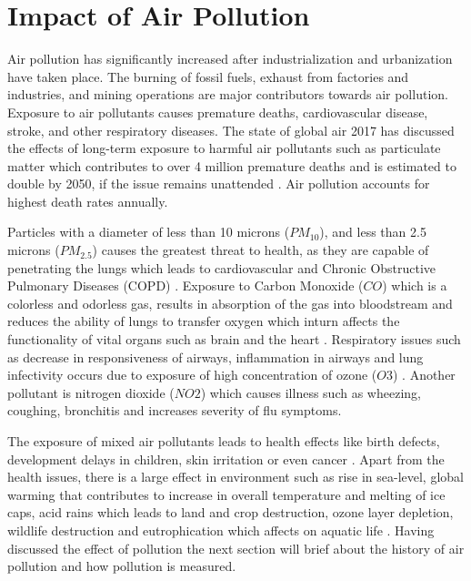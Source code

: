 \section{Impact of Air Pollution}

Air pollution has significantly increased after industrialization and urbanization have taken place. The burning of fossil fuels, exhaust from factories and industries, and mining operations are major contributors towards air pollution. Exposure to air pollutants causes premature deaths, cardiovascular disease, stroke, and other respiratory diseases. The state of global air 2017 has discussed the effects of long-term exposure to harmful air pollutants such as particulate matter which contributes to over 4 million premature deaths and is estimated to double by 2050, if the issue remains unattended \cite{HealthEffectsInstitute2017}. Air pollution accounts for highest death rates annually. 

\par

Particles with a diameter of less than 10 microns ($PM_{10}$), and less than 2.5 microns ($PM_{2.5}$) causes the greatest threat to health, as they are capable of penetrating the lungs which leads to cardiovascular and Chronic Obstructive Pulmonary Diseases (COPD) \cite{who} \cite{Tian2016}. Exposure to Carbon Monoxide ($CO$) which is a colorless and odorless gas, results in absorption of the gas into bloodstream and reduces the ability of lungs to transfer oxygen which inturn affects the functionality of vital organs such as brain and the heart \cite{Sierra-vargas2012} \cite{Golbabaei2012}. Respiratory issues such as decrease in responsiveness of airways, inflammation in airways and lung infectivity occurs due to exposure of high concentration of ozone ($O3$) \cite{Lippmann1989}. Another pollutant is nitrogen dioxide ($NO2$) which causes illness such as wheezing, coughing, bronchitis and increases severity of flu symptoms.
\par

 The exposure of mixed air pollutants leads to health effects like birth defects, development delays in children, skin irritation or even cancer \cite{MarilenaKampa2007}. Apart from the health issues, there is a large effect in environment such as rise in sea-level, global warming that contributes to increase in overall temperature and melting of ice caps, acid rains which leads to land and crop destruction, ozone layer depletion, wildlife destruction and eutrophication which affects on aquatic life \cite{pollutioneffect}. Having discussed the effect of pollution the next section will brief about the history of air pollution and how pollution is measured. 


